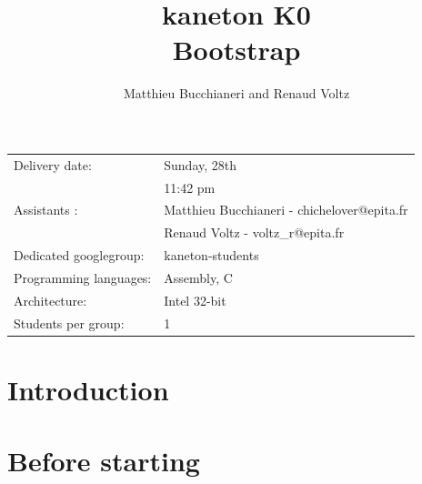 
%
%


\usepackage{pdfpages}

%
%


%
%

\title{kaneton K0\\Bootstrap}

%
%

\author{\small{Matthieu Bucchianeri} and
        \small{Renaud Voltz}}

%
%



\maketitle

\vspace{5mm}

\begin{tabular}{p{7cm}l}
Delivery date: & Sunday, 28th \\
               & 11:42 pm \\
Assistants : & Matthieu Bucchianeri - \small{chichelover@epita.fr} \\
             & Renaud Voltz - \small{voltz\_r@epita.fr} \\
Dedicated googlegroup: & kaneton-students \\
Programming languages: & Assembly, C \\
Architecture: & Intel 32-bit \\
Students per group: & 1
\end{tabular}

\section*{Introduction}

\section*{Before starting}

